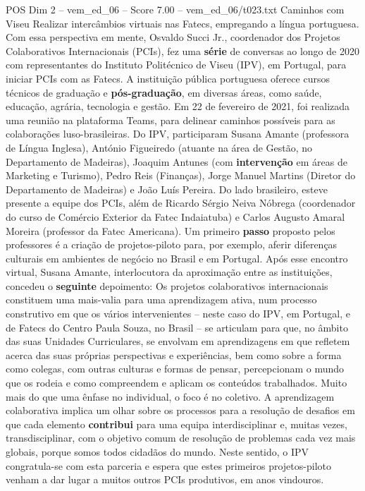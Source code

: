 \begin{textsample}{POS Dim 2 – vem\_ed\_06 – Score 7.00 – vem\_ed\_06/t023.txt}  \label{ex:f2_pos_094}
Caminhos com Viseu Realizar intercâmbios virtuais nas Fatecs, empregando a língua portuguesa.
Com essa perspectiva em mente, Osvaldo Succi Jr., coordenador dos Projetos Colaborativos Internacionais (PCIs), fez uma \textbf{série} de conversas ao longo de 2020 com representantes do Instituto Politécnico de Viseu (IPV), em Portugal, para iniciar PCIs com as Fatecs.
A instituição pública portuguesa oferece cursos técnicos de graduação e \textbf{pós-graduação}, em diversas áreas, como saúde, educação, agrária, tecnologia e gestão.
Em 22 de fevereiro de 2021, foi realizada uma reunião na plataforma Teams, para delinear caminhos possíveis para as colaborações luso-brasileiras.
Do IPV, participaram Susana Amante (professora de Língua Inglesa), António Figueiredo (atuante na área de Gestão, no Departamento de Madeiras), Joaquim Antunes (com \textbf{intervenção} em áreas de Marketing e Turismo), Pedro Reis (Finanças), Jorge Manuel Martins (Diretor do Departamento de Madeiras) e João Luís Pereira.
Do lado brasileiro, esteve presente a equipe dos PCIs, além de Ricardo Sérgio Neiva Nóbrega (coordenador do curso de Comércio Exterior da Fatec Indaiatuba) e Carlos Augusto Amaral Moreira (professor da Fatec Americana).
Um primeiro \textbf{passo} proposto pelos professores é a criação de projetos-piloto para, por exemplo, aferir diferenças culturais em ambientes de negócio no Brasil e em Portugal.
Após esse encontro virtual, Susana Amante, interlocutora da aproximação entre as instituições, concedeu o \textbf{seguinte} depoimento: Os projetos colaborativos internacionais constituem uma mais-valia para uma aprendizagem ativa, num processo construtivo em que os vários intervenientes – neste caso do IPV, em Portugal, e de Fatecs do Centro Paula Souza, no Brasil – se articulam para que, no âmbito das suas Unidades Curriculares, se envolvam em aprendizagens em que refletem acerca das suas próprias perspectivas e experiências, bem como sobre a forma como colegas, com outras culturas e formas de pensar, percepcionam o mundo que os rodeia e como compreendem e aplicam os conteúdos trabalhados.
Muito mais do que uma ênfase no individual, o foco é no coletivo.
A aprendizagem colaborativa implica um olhar sobre os processos para a resolução de desafios em que cada elemento \textbf{contribui} para uma equipa interdisciplinar e, muitas vezes, transdisciplinar, com o objetivo comum de resolução de problemas cada vez mais globais, porque somos todos cidadãos do mundo.
Neste sentido, o IPV congratula-se com esta parceria e espera que estes primeiros projetos-piloto venham a dar lugar a muitos outros PCIs produtivos, em anos vindouros.

\end{textsample}
